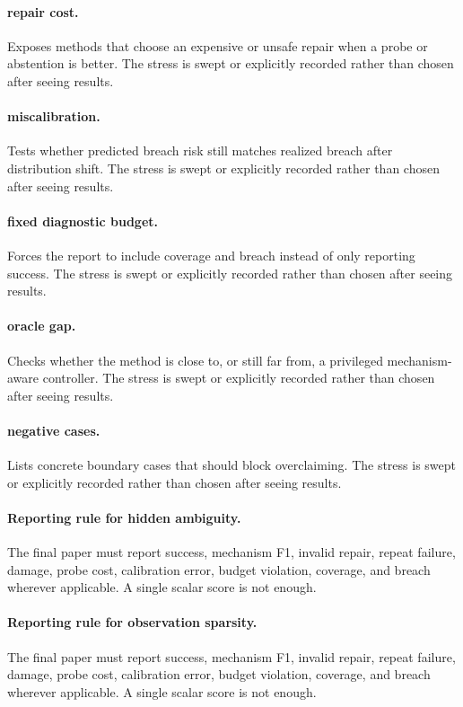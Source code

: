 \documentclass{article}
\begin{document}
\paragraph{repair cost.} Exposes methods that choose an expensive or unsafe repair when a probe or abstention is better. The stress is swept or explicitly recorded rather than chosen after seeing results.
\paragraph{miscalibration.} Tests whether predicted breach risk still matches realized breach after distribution shift. The stress is swept or explicitly recorded rather than chosen after seeing results.
\paragraph{fixed diagnostic budget.} Forces the report to include coverage and breach instead of only reporting success. The stress is swept or explicitly recorded rather than chosen after seeing results.
\paragraph{oracle gap.} Checks whether the method is close to, or still far from, a privileged mechanism-aware controller. The stress is swept or explicitly recorded rather than chosen after seeing results.
\paragraph{negative cases.} Lists concrete boundary cases that should block overclaiming. The stress is swept or explicitly recorded rather than chosen after seeing results.
\paragraph{Reporting rule for hidden ambiguity.} The final paper must report success, mechanism F1, invalid repair, repeat failure, damage, probe cost, calibration error, budget violation, coverage, and breach wherever applicable. A single scalar score is not enough.
\paragraph{Reporting rule for observation sparsity.} The final paper must report success, mechanism F1, invalid repair, repeat failure, damage, probe cost, calibration error, budget violation, coverage, and breach wherever applicable. A single scalar score is not enough.
\end{document}
